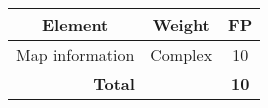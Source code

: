 \begin{center}
\begin{tabular}{|c|c|c|}
\hline
\multicolumn{1}{|c|}{\textbf{Element}} & \multicolumn{1}{c|}{\textbf{Weight}} & \multicolumn{1}{c|}{\textbf{FP}}\\
\hline
Map information	&Complex	&10\\
\hline
\multicolumn{2}{|c|}{\textbf{Total}} & \multicolumn{1}{c|}{\textbf{10}}\\
\hline
\end{tabular}
\end{center}
